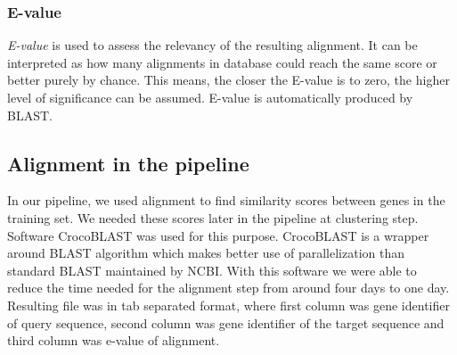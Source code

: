 \subsubsection{E-value}
\emph{E-value} is used to assess the relevancy of the resulting alignment.
It can be interpreted as how many alignments in database could reach the same score or better purely by chance.
This means, the closer the E-value is to zero, the higher level of significance can be assumed.
E-value is automatically produced by BLAST.

\subsection{Alignment in the pipeline}
In our pipeline, we used alignment to find similarity scores between genes in the training set.
We needed these scores later in the pipeline at clustering step.
Software CrocoBLAST was used for this purpose.
CrocoBLAST is a wrapper around BLAST algorithm which makes better use of parallelization than standard BLAST maintained by NCBI.
With this software we were able to reduce the time needed for the alignment step from around four days to one day.
Resulting file was in tab separated format, where first column was gene identifier of query sequence, second column was gene identifier of the target sequence and third column was e-value of alignment.
